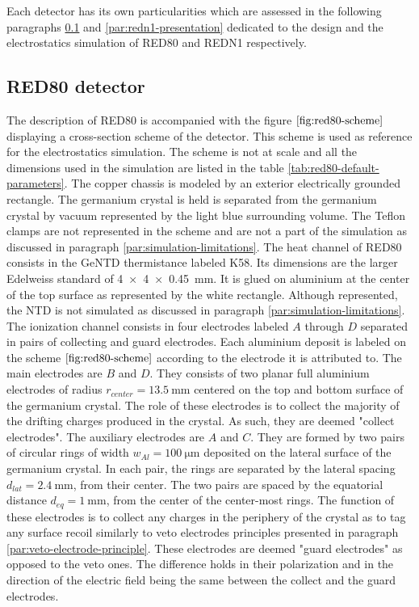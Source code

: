 Each detector has its own particularities which are assessed in the following paragraphs \ref{par:red80-presentation} and \ref{par:redn1-presentation} dedicated to the design and the electrostatics simulation of RED80 and REDN1 respectively.


\subsection{RED80 detector}
\label{par:red80-presentation}

The description of RED80 is accompanied with the figure $\ref{fig:red80-scheme}$ displaying a cross-section scheme of the detector. This scheme is used as reference for the electrostatics simulation. The scheme is not at scale and all the dimensions used in the simulation are listed in the table \ref{tab:red80-default-parameters}.
The copper chassis is modeled by an exterior electrically grounded rectangle. The germanium crystal is held is separated from the germanium crystal by vacuum represented by the light blue surrounding volume.
The Teflon clamps are not represented in the scheme and are not a part of the simulation as discussed in paragraph \ref{par:simulation-limitations}.
The heat channel of RED80 consists in the GeNTD thermistance labeled K58. Its dimensions are the larger Edelweiss standard of \SI{4 x 4 x 0.45}{\mm}. It is glued on aluminium at the center of the top surface as represented by the white rectangle. Although represented, the NTD is not simulated as discussed in paragraph \ref{par:simulation-limitations}.
The ionization channel consists in four electrodes labeled $A$ through $D$ separated in pairs of collecting and guard electrodes. Each aluminium deposit is labeled on the scheme $\ref{fig:red80-scheme}$ according to the electrode it is attributed to.
The main electrodes are $B$ and $D$. They consists of two planar full aluminium electrodes of radius $r_{center} = \SI{13.5}{\mm}$ centered on the top and bottom surface of the germanium crystal. The role of these electrodes is to collect the majority of the drifting charges produced in the crystal. As such, they are deemed "collect electrodes".
The auxiliary electrodes are $A$ and $C$. They are formed by two pairs of circular rings of width $w_{Al}=\SI{100}{\micro\meter}$ deposited on the lateral surface of the germanium crystal. In each pair, the rings are separated by the lateral spacing $d_{lat}=\SI{2.4}{\mm}$, from their center. The two pairs are spaced by the equatorial distance $d_{eq} = \SI{1}{\mm}$, from the center of the center-most rings. The function of these electrodes is to collect any charges in the periphery of the crystal as to tag any surface recoil similarly to veto electrodes principles presented in paragraph \ref{par:veto-electrode-principle}. These electrodes are deemed "guard electrodes" as opposed to the veto ones. The difference holds in their polarization and in the direction of the electric field being the same between the collect and the guard electrodes.
